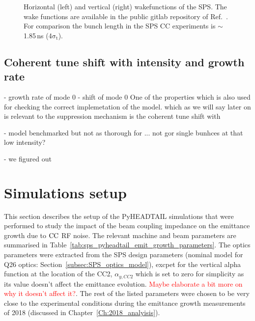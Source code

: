 \begin{figure}[!ht]
\begin{subfigure}[t]{0.45\textwidth}
    \end{subfigure}
    \hfill
     \caption{Horizontal (left) and vertical (right) wakefunctions of the SPS. The wake functions are available in the public gitlab repository of Ref.~\cite{sps_impedance_model_git}. For comparison the bunch length in the SPS CC experiments is $\sim$ 1.85\,ns (4$\mathrm{\sigma_t}$).} %
     \label{fig:sps_wakefunctions_model_H_V}
 \end{figure}




\subsection{Coherent tune shift with intensity and growth rate}
- growth rate of mode 0
- shift of mode 0
One of the properties which is also used for checking the correct implemetation of the model. which as we will say later on is relevant to the suppression mechanism is the coherent tune shift with 

- model benchmarked but not as thorough for ... not gor single bunhces at that low intensity?

- we figured out


\section{Simulations setup}

This section describes the setup of the PyHEADTAIL simulations that were performed to study the impact of the beam coupling impedance on the emittance growth due to ${\mathrm{CC}}$ RF noise. The relevant machine and beam parameters are summarised in Table~\ref{tab:sps_pyheadtail_emit_growth_parameters}. The optics parameters were extracted from the SPS design parameters (nominal model for Q26 optics: Section~\ref{subsec:SPS_optics_model}), excpet for the vertical alpha function at the location of the CC2, $\alpha_{y, CC2}$ which is set to zero for simplicity as its value doesn't affect the emittance evolution. \textcolor{red}{Maybe elaborate a bit more on why it doesn't affect it?}. The rest of the listed parameters were chosen to be very close to the experimental conditions during the emittance growth measurements of 2018 (discussed in Chapter~\ref{Ch:2018_analyisis}).


